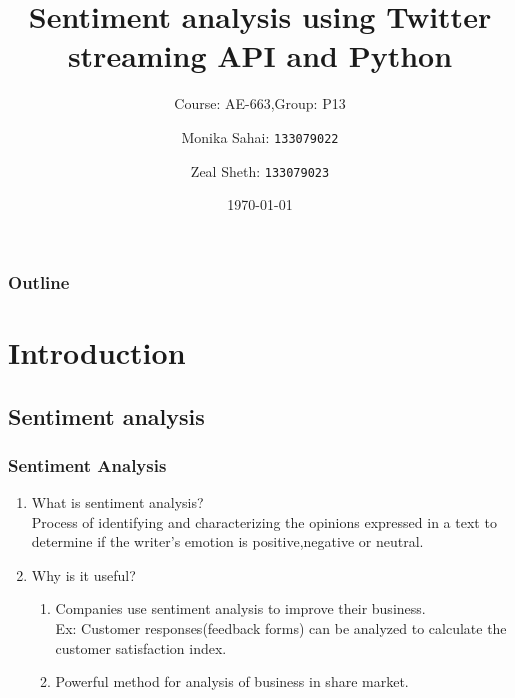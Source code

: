 \documentclass{beamer}
\title{Sentiment analysis using Twitter streaming API and Python}
\subtitle{Course: AE-663,Group: P13}
\author{Monika Sahai:
\texttt{133079022}
\and
Zeal Sheth:
\texttt{133079023}
}
\institute{Indian Institute Of Technology, Bombay}
\date{\today}
\begin{document}
\begin{frame}
\maketitle
\end{frame}

\begin{frame}
\frametitle{Outline}
\tableofcontents
\end{frame}

\section{Introduction}

\subsection{Sentiment analysis}
\begin{frame}
\frametitle{Sentiment Analysis}
\begin{enumerate}
\item What is sentiment analysis?\\
Process of identifying and characterizing the opinions expressed in a text to determine if the writer's emotion is positive,negative or neutral.\\
\item Why is it useful?
\begin{enumerate}
\item Companies use sentiment analysis to improve their business.\\
Ex: Customer responses(feedback forms) can be analyzed to calculate the customer satisfaction index.
\item Powerful method for analysis of business in share market.
\end{enumerate}
\end{enumerate}
\end{frame}
\end{document}
